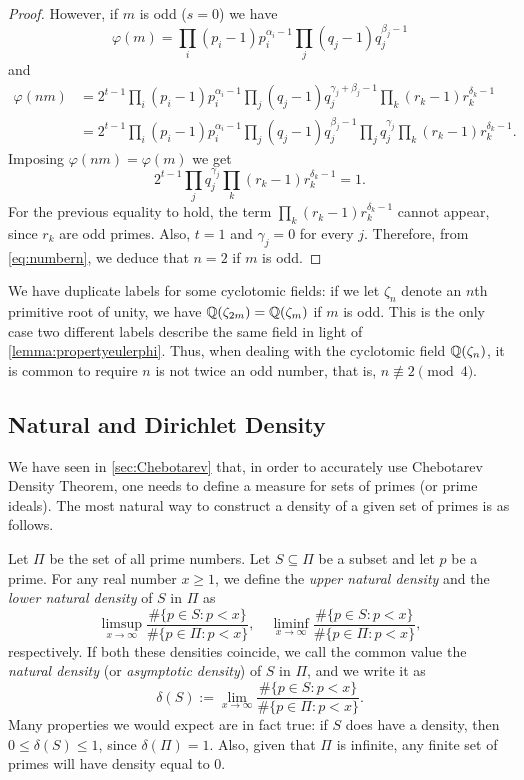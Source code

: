 \documentclass[../main.tex]{subfiles}
\begin{document}
\begin{proof}
	However, if $m$ is odd ($s=0$) we have
	\begin{equation*}
		\varphi(m)=\prod_i(p_i-1)p_i^{\alpha_i-1}\prod_j(q_j-1)q_j^{\beta_j-1}
	\end{equation*}
	and
	\begin{align*}
		\varphi(nm)&=2^{t-1}\prod_i(p_i-1)p_i^{\alpha_i-1}\prod_j(q_j-1)q_j^{\gamma_j+\beta_j-1}\prod_k(r_k-1)r_k^{\delta_k-1}\\
		&=2^{t-1}\prod_i(p_i-1)p_i^{\alpha_i-1}\prod_j(q_j-1)q_j^{\beta_j-1}\prod_jq_j^{\gamma_j}\prod_k(r_k-1)r_k^{\delta_k-1}.
	\end{align*}
	Imposing $\varphi(nm)=\varphi(m)$ we get
	\begin{equation*}
		2^{t-1}\prod_jq_j^{\gamma_j}\prod_k(r_k-1)r_k^{\delta_k-1}=1.
	\end{equation*}
	For the previous equality to hold, the term $\prod_k(r_k-1)r_k^{\delta_k-1}$ cannot appear, since $r_k$ are odd primes. Also, $t=1$ and $\gamma_j=0$ for every $j$. Therefore, from \cref{eq:numbern}, we deduce that $n=2$ if $m$ is odd.
\end{proof}

We have duplicate labels for some cyclotomic fields: if we let $\zeta_n$ denote an $n$th primitive root of unity, we have $\mathbb{Q}(\zeta_{2m})=\mathbb{Q}(\zeta_{m})$ if $m$ is odd. This is the only case two different labels describe the same field in light of \cref{lemma:propertyeulerphi}. Thus, when dealing with the cyclotomic field $\mathbb{Q}(\zeta_n)$, it is common to require $n$ is not twice an odd number, that is, $n\not\equiv 2\pmod{4}$.

\subsection{Natural and Dirichlet Density}\label{sec:naturalDirichletdens}
We have seen in \cref{sec:Chebotarev} that, in order to accurately use Chebotarev Density Theorem, one needs to define a measure for sets of primes (or prime ideals). The most natural way to construct a density of a given set of primes is as follows.

Let $\Pi$ be the set of all prime numbers. Let $S\subseteq\Pi$ be a subset and let $p$ be a prime. For any real number $x\geqslant 1$, we define the \emph{upper natural density} and the \emph{lower natural density} of $S$ in $\Pi$ as
	\begin{equation*}
		\limsup_{x\rightarrow\infty}\frac{\#\{p\in S: p < x\}}{\#\{p\in \Pi: p < x\}}, \quad \liminf_{x\rightarrow\infty}\frac{\#\{p\in S: p < x\}}{\#\{p\in \Pi: p < x\}},
	\end{equation*}
	respectively. If both these densities coincide, we call the common value the \emph{natural density} (or \emph{asymptotic density}) of $S$ in $\Pi$, and we write it as
	\begin{equation*}
		\delta(S):=\lim_{x\rightarrow\infty}\frac{\#\{p\in S: p < x\}}{\#\{p\in \Pi: p < x\}}.
	\end{equation*}
Many properties we would expect are in fact true: if $S$ does have a density, then $0\leqslant \delta(S)\leqslant 1$, since $\delta(\Pi)=1$. Also, given that $\Pi$ is infinite, any finite set of primes will have density equal to $0$.
\end{document}
